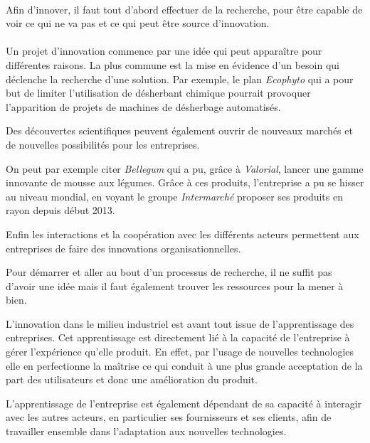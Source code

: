 \documentclass[a4paper,12pt]{report}
\begin{document}
			\paragraph{}Afin d'innover, il faut tout d'abord effectuer de la recherche, pour être capable de voir ce qui ne va pas et ce qui peut être source d'innovation.		
		
			\paragraph{}Un projet d’innovation commence par une idée qui peut apparaître pour différentes raisons. La plus commune est la mise en évidence d’un besoin qui déclenche la recherche d’une solution. Par exemple, le plan \textit{Ecophyto}\cite{RobotsChamps} qui a pour but de limiter l’utilisation de désherbant chimique pourrait provoquer l’apparition de projets de machines de désherbage automatisés.
			 
			Des découvertes scientifiques peuvent également ouvrir de nouveaux marchés et de nouvelles possibilités pour les entreprises. 
			
			On peut par exemple citer \textit{Bellegum}\cite{Bellegum} qui a pu, grâce à \textit{Valorial}, lancer une gamme innovante de mousse aux légumes. Grâce à ces produits, l’entreprise a pu se hisser au niveau mondial, en voyant le groupe \textit{Intermarché} proposer ses produits en rayon depuis début 2013.
			
			Enfin les interactions et la coopération avec les différents acteurs permettent aux entreprises de faire des innovations organisationnelles.
			
			Pour démarrer et aller au bout d’un processus de recherche, il ne suffit pas d’avoir une idée mais il faut également trouver les ressources pour la mener à bien.
			
			L’innovation dans le milieu industriel est avant tout issue de l’apprentissage des entreprises. Cet apprentissage est directement lié à la capacité de l’entreprise à gérer l’expérience qu’elle produit. En effet, par l’usage de nouvelles technologies elle en perfectionne la maîtrise ce qui conduit à une plus grande acceptation de la part des utilisateurs et donc une amélioration du produit. 
			
			L’apprentissage de l’entreprise est également dépendant de sa capacité à interagir avec les autres acteurs, en particulier ses fournisseurs et ses clients, afin de travailler ensemble dans l’adaptation aux nouvelles technologies.
			
\end{document}
